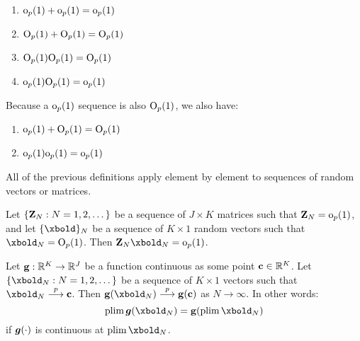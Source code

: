 \documentclass[11pt, oneside, a4paper, article]{article}
\numberwithin{equation}{section}
\begin{document}
\begin{remark}
\item
\begin{enumerate}[noitemsep]
\item $\text{o}_{p}(1) + \text{o}_{p}(1) = \text{o}_{p}(1)$

\item $\text{O}_{p}(1) + \text{O}_{p}(1) = \text{O}_{p}(1)$

\item $\text{O}_{p}(1) \text{O}_{p}(1) = \text{O}_{p}(1)$

\item $\text{o}_{p}(1) \text{O}_{p}(1) = \text{o}_{p}(1)$
\end{enumerate}

\item
Because a $\text{o}_{p}(1)$ sequence is also $\text{O}_{p}(1)$, we also have:

\begin{enumerate}[noitemsep]
\addtocounter{enumi}{4}
\item $\text{o}_{p}(1) + \text{O}_{p}(1) = \text{O}_{p}(1)$

\item $\text{o}_{p}(1) \text{o}_{p}(1) = \text{o}_{p}(1)$
\end{enumerate}

\end{remark}

\begin{remark} All of the previous definitions apply element by element to sequences of random vectors or matrices.
\end{remark}

\begin{lem}
Let $\{\mathbf{Z}_{N} : N = 1, 2, \dots\}$	 be a sequence of $J \times K$ matrices such that $\mathbf{Z}_{N} = \text{o}_{p}(1)$, and let $\seq{\xbold}_{N}$ be a sequence of $K \times 1$ random vectors such that $\xbold_{N} = \bigOp(1)$.
Then $\Zbold_{N} \xbold_{N} = \litop(1)$.
\end{lem}

\begin{lem}
Let $\mathbf{g}: \mathbb{R}^{K} \to \mathbb{R}^{J}$ be a function continuous as some point $\mathbf{c} \in \mathbb{R}^{K}$.
Let $\seq{\xbold_{N} : N = 1, 2, \dots}$ be a sequence of $K \times 1$ vectors such that $\xbold_{N} \arrowp \mbf{c}$.
Then $\mbf{g} (\xbold_{N}) \arrowp \mbf{g} (\mbf{c})$ as $N \to \infty$.
In other words:
\begin{equation}
	\plim \mbs{g}(\xbold_{N}) = \mbf{g} (\plim \xbold_{N})
\end{equation}
if $\boldsymbol{g}(\cdot)$ is continuous at $\plim \xbold_{N}$.
\end{lem}
\end{document}
